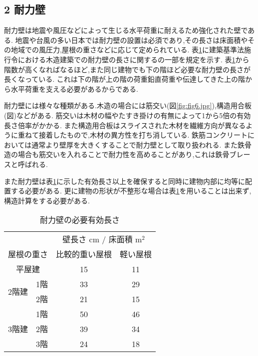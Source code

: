 \subsection*{2 耐力壁}
耐力壁は地震や風圧などによって生じる水平荷重に耐えるため強化された壁である.
地震や台風の多い日本では耐力壁の設置は必須であり,その長さは床面積やその地域での風圧力,屋根の重さなどに応じて定められている.
表\ref{tab:tairyoku}に建築基準法施行令における木造建築での耐力壁の長さに関するの一部を規定を示す.
表\ref{tab:tairyoku}から階数が高くなればなるほど,また同じ建物でも下の階ほど必要な耐力壁の長さが長くなっている.
これは下の階が上の階の荷重鉛直荷重や伝達してきた上の階から水平荷重を支える必要があるからである.

耐力壁には様々な種類がある.木造の場合には筋交い(図\ref{fig:fig6.jpg}),構造用合板(図\cite{gouhan})などがある.
筋交いは木材の幅やたすき掛けの有無によって1から5倍の有効長さ倍率がかかる.\cite{alma990015457520204034}
また構造用合板はスライスされた木材を繊維方向が異なるように重ねて接着したもので,木材の異方性を打ち消している.
鉄筋コンクリートにおいては通常より壁厚を大きくすることで耐力壁として取り扱われる.\cite{alma990015457520204034}
また鉄骨造の場合も筋交いを入れることで耐力性を高めることがあり,これは鉄骨ブレースと呼ばれる.\cite{tekkotu:online}

また耐力壁は表\ref{tab:tairyoku}に示した有効長さ以上を確保すると同時に建物内部に均等に配置する必要がある.
更に建物の形状が不整形な場合は表\ref{tab:tairyoku}を用いることは出来ず,構造計算をする必要がある.
\begin{table}[h]
\caption{耐力壁の必要有効長さ\cite{alma990015457520204034}}
\label{tab:tairyoku}
\centering
\begin{tabular}{cc|cc}
\hline
&&\multicolumn{2}{c}{壁長さ $\si{\centi\metre}$ / 床面積 $\si{\metre^2}$}\\
\multicolumn{2}{c|}{屋根の重さ}&比較的重い屋根&軽い屋根\\
\hline \hline
\multicolumn{2}{c|}{平屋建}&15&11\\
\hline
\multirow{2}{*}{2階建}&1階&33&29\\
&2階&21&15\\
\hline
\multirow{3}{*}{3階建}&1階&50&46\\
&2階&39&34\\
&3階&24&18\\
\hline
\end{tabular}
\end{table}
\begin{figure}[htbp]
  \begin{minipage}{0.5\hsize}
  \end{minipage}
  \begin{minipage}{0.5\hsize}
  \end{minipage}
\end{figure}